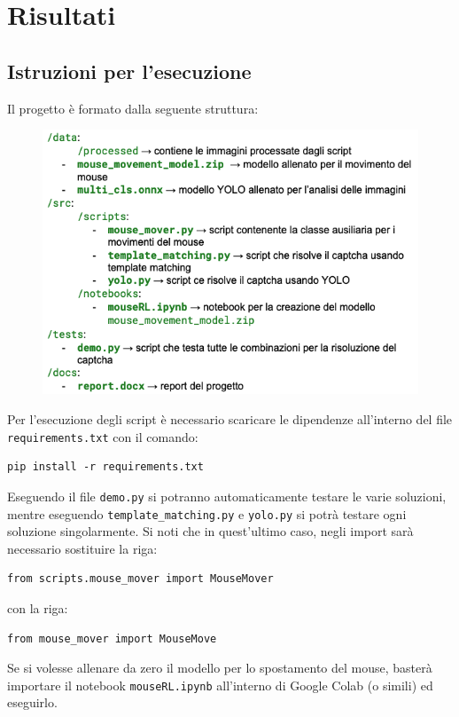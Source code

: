 \documentclass{article}
\begin{document}
\section{Risultati}

\subsection{Istruzioni per l'esecuzione}

Il progetto è formato dalla seguente struttura:

\begin{figure}[h!]
    \centering
    \includegraphics[width=1\linewidth]{struttura.png}
    \label{struttura}
\end{figure}

Per l’esecuzione degli script è necessario scaricare le dipendenze all’interno del file \texttt{requirements.txt} con il comando:
\begin{verbatim}
pip install -r requirements.txt
\end{verbatim}
Eseguendo il file \texttt{demo.py} si potranno automaticamente testare le varie soluzioni, mentre eseguendo \texttt{template\_matching.py} e \texttt{yolo.py} si potrà testare ogni soluzione singolarmente. Si noti che in quest'ultimo caso, negli import sarà necessario sostituire la riga:
\begin{verbatim}
from scripts.mouse_mover import MouseMover
\end{verbatim}
con la riga:
\begin{verbatim}
from mouse_mover import MouseMove
\end{verbatim}

Se si volesse allenare da zero il modello per lo spostamento del mouse, basterà importare il notebook \texttt{mouseRL.ipynb} all’interno di Google Colab (o simili) ed eseguirlo.
\end{document}
